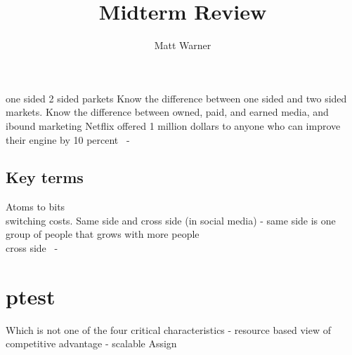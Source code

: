\documentclass{report}
\title{\Huge{Midterm Review}}
\author{\huge{Matt Warner}}
\date{\huge{}}
\begin{document}
    \maketitle
one sided 2 sided parkets
Know the difference between one sided and two sided markets. 
\bigbreak \noindent
Know the difference between owned, paid, and earned media, and ibound marketing
\bigbreak \noindent
Netflix offered 1 million dollars to anyone who can improve their engine by 10 percent \ - \
\bigbreak \noindent
\subsection*{Key terms}
Atoms to bits \\
switching costs.
Same side and cross side (in social media) - same side is one group of people that grows with more people \\
cross side \ - \
\section{ptest}
Which is not one of the four critical characteristics - resource based view of competitive advantage - scalable
\q  Assign 
\end{document}
